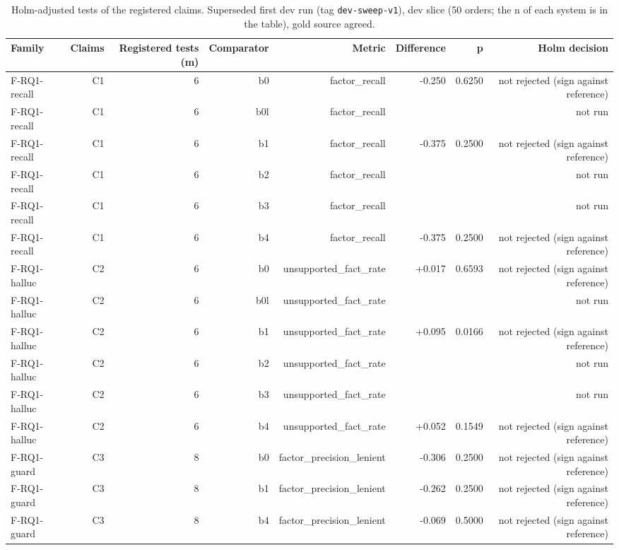 \begin{table}[t]
\centering
\small
\caption{Holm-adjusted tests of the registered claims. Superseded first dev run (tag \texttt{dev-sweep-v1}), dev slice (50 orders; the n of each system is in the table), gold source agreed.}
\label{tab:table_holm}
\begin{adjustbox}{max width=\textwidth}
\begin{tabular}{lrrrrrrr}
\toprule
Family & Claims & Registered tests (m) & Comparator & Metric & Difference & p & Holm decision \\
\midrule
F-RQ1-recall & C1 & 6 & b0 & factor\_recall & -0.250 & 0.6250 & not rejected (sign against reference) \\
F-RQ1-recall & C1 & 6 & b0l & factor\_recall &  &  & not run \\
F-RQ1-recall & C1 & 6 & b1 & factor\_recall & -0.375 & 0.2500 & not rejected (sign against reference) \\
F-RQ1-recall & C1 & 6 & b2 & factor\_recall &  &  & not run \\
F-RQ1-recall & C1 & 6 & b3 & factor\_recall &  &  & not run \\
F-RQ1-recall & C1 & 6 & b4 & factor\_recall & -0.375 & 0.2500 & not rejected (sign against reference) \\
F-RQ1-halluc & C2 & 6 & b0 & unsupported\_fact\_rate & +0.017 & 0.6593 & not rejected (sign against reference) \\
F-RQ1-halluc & C2 & 6 & b0l & unsupported\_fact\_rate &  &  & not run \\
F-RQ1-halluc & C2 & 6 & b1 & unsupported\_fact\_rate & +0.095 & 0.0166 & not rejected (sign against reference) \\
F-RQ1-halluc & C2 & 6 & b2 & unsupported\_fact\_rate &  &  & not run \\
F-RQ1-halluc & C2 & 6 & b3 & unsupported\_fact\_rate &  &  & not run \\
F-RQ1-halluc & C2 & 6 & b4 & unsupported\_fact\_rate & +0.052 & 0.1549 & not rejected (sign against reference) \\
F-RQ1-guard & C3 & 8 & b0 & factor\_precision\_lenient & -0.306 & 0.2500 & not rejected (sign against reference) \\
F-RQ1-guard & C3 & 8 & b1 & factor\_precision\_lenient & -0.262 & 0.2500 & not rejected (sign against reference) \\
F-RQ1-guard & C3 & 8 & b4 & factor\_precision\_lenient & -0.069 & 0.5000 & not rejected (sign against reference) \\

\end{tabular}
\end{adjustbox}
\end{table}
